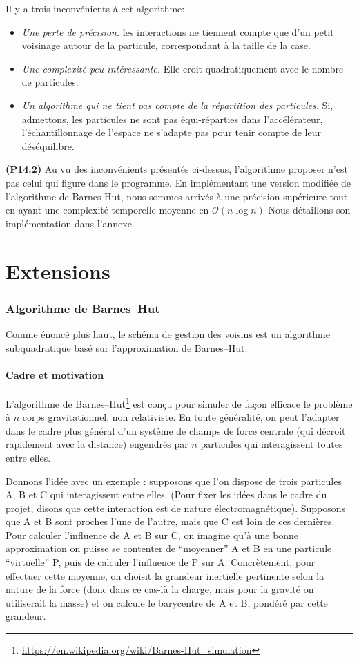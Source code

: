 \documentclass[12pt, letterpaper, twoside]{article}
\def\O{\mathcal{O}}
\begin{document}
Il y a trois inconvénients à cet algorithme:
\begin{itemize}
	\item \textit{Une perte de précision.} les interactions ne tiennent compte que d'un petit voisinage autour de la particule, correspondant à la taille de la case.
	\item \textit{Une complexité peu intéressante.} Elle croit quadratiquement avec le nombre de particules.
	\item \textit{Un algorithme qui ne tient pas compte de la répartition des particules.} Si, admettons, les particules ne sont pas équi-réparties dans l'accélérateur, l'échantillonnage de l'espace ne s'adapte pas pour tenir compte de leur déséquilibre.
\end{itemize}

\noindent \textbf{(P14.2)} Au vu des inconvénients présentés ci-dessus, l'algorithme proposer n'est pas celui qui figure dans le programme. En implémentant une version modifiée de l'algorithme de Barnes-Hut, nous sommes arrivés à une précision supérieure tout en ayant une complexité temporelle moyenne en $\O(n \log n)$ Nous détaillons son implémentation dans l'annexe.

\newpage

\part*{Extensions}
\section{Algorithme de Barnes--Hut}
Comme énoncé plus haut, le schéma de gestion des voisins est un algorithme subquadratique basé sur l'approximation de Barnes--Hut.
\subsection*{Cadre et motivation}
L'algorithme de Barnes--Hut\footnote{\url{https://en.wikipedia.org/wiki/Barnes-Hut_simulation}} est conçu pour simuler de façon efficace le problème à $n$ corps gravitationnel, non relativiste. En toute généralité, on peut l'adapter dans le cadre plus général d'un système de champs de force centrale (qui décroit rapidement avec la distance) engendrés par $n$ particules qui interagissent toutes entre elles.

Donnons l'idée avec un exemple : supposons que l'on dispose de trois particules A, B et C qui interagissent entre elles. (Pour fixer les idées dans le cadre du projet, disons que cette interaction est de nature électromagnétique). Supposons que A et B sont proches l'une de l'autre, mais que C est loin de ces dernières. Pour calculer l'influence de A et B sur C, on imagine qu'à une bonne approximation on puisse se contenter de ``moyenner'' A et B en une particule ``virtuelle'' P, puis de calculer l'influence de P sur A. Concrètement, pour effectuer cette moyenne, on choisit la grandeur inertielle pertinente selon la nature de la force (donc dans ce cas-là la charge, mais pour la gravité on utiliserait la masse) et on calcule le barycentre de A et B, pondéré par cette grandeur.
\end{document}
